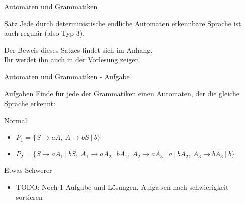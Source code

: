 \begin{frame}{Automaten und Grammatiken}
  \begin{exampleblock}{Satz}
    Jede durch deterministische endliche Automaten erkennbare Sprache ist auch regulär (also Typ 3).
  \end{exampleblock}
  Der Beweis dieses Satzes findet sich im Anhang.\\
  Ihr werdet ihn auch in der Vorlesung zeigen.
\end{frame}

{
\begin{frame}{Automaten und Grammatiken - Aufgabe}
  \begin{alertblock}{Aufgaben}
    Finde für jede der Grammatiken einen Automaten, der die gleiche Sprache erkennt:
  \end{alertblock}
    \begin{block}{Normal}
        \begin{itemize}
            \item $P_1 = \{S \to aA ,\ A \to bS\ |\ b\}$
            \item $P_2 = \{S \to aA_1\ |\ bS ,\ A_1 \to aA_2\ |\ bA_1 ,\ A_2 \to aA_3\ |\ a\ |\ bA_2 ,\ A_3 \to bA_3\ |\ b\}$
        \end{itemize}
    \end{block}
    \begin{block}{Etwas Schwerer}
        \begin{itemize}
            \item TODO: Noch 1 Aufgabe und Lösungen, Aufgaben nach schwierigkeit sortieren
        \end{itemize}
    \end{block}
\end{frame}}